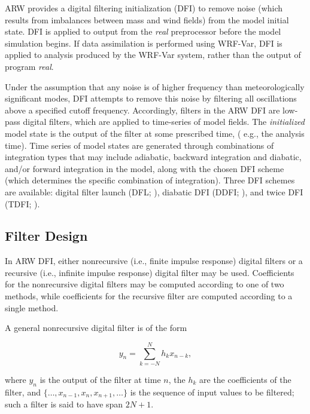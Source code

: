 ARW provides a digital filtering initialization (DFI) to 
remove noise (which results from imbalances between mass and wind fields) 
from the model initial state. DFI is applied to output from the {\it real} 
preprocessor before the model simulation begins. If data assimilation is 
performed using WRF-Var, DFI is applied to analysis produced by the 
WRF-Var system, rather than the output of program {\it real}.

Under the assumption that any noise is of 
higher frequency than meteorologically significant modes, DFI attempts to 
remove this noise by filtering all oscillations above a specified cutoff 
frequency. Accordingly, filters in the ARW DFI are low-pass digital 
filters, which are applied to time-series of model fields. The {\it initialized} 
model state is the output of the filter at some prescribed time, 
( e.g., the analysis time). Time series of model states are generated through 
combinations of integration types that may include adiabatic, backward integration and diabatic, and/or forward 
integration in the model, along with the chosen DFI scheme (which determines the 
specific combination of integration). Three DFI schemes are available: 
digital filter launch (DFL; \cite{lynchhuang94}), diabatic DFI (DDFI; \cite{huanglynch93}), 
and twice DFI (TDFI; \cite{lynchhuang94}).

\subsection{Filter Design}

In ARW DFI, either nonrecursive (i.e., finite impulse response) digital 
filters or a recursive (i.e., infinite impulse response) digital filter may 
be used. Coefficients for the nonrecursive digital filters may be 
computed according to one of two methods, while coefficients for the 
recursive filter are computed according to a single method.

A general nonrecursive digital filter is of the form

\begin{equation}
y_n = \sum_{k=-N}^{N} h_k x_{n-k},
\label{fir_filter}
\end{equation}

\noindent
where $y_n$ is the output of the filter at time $n$, the $h_k$ are the 
coefficients of the filter, and $\{ \ldots , x_{n-1}, x_n, x_{n+1}, \ldots \}$ 
is the sequence of input values to be filtered; such a filter is said to have 
span $2N+1$. 

